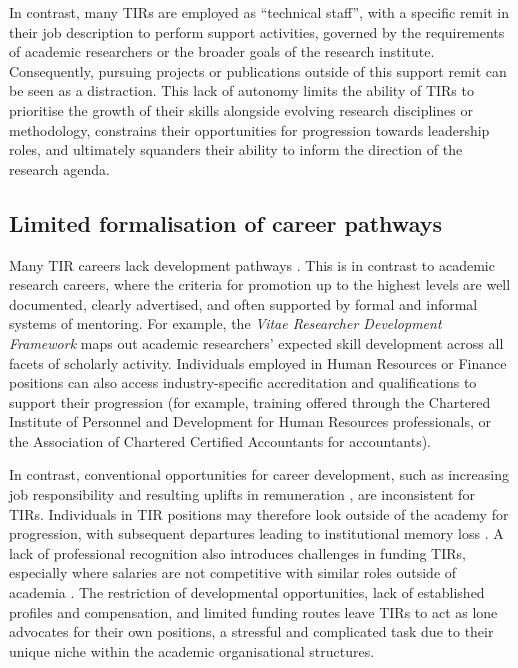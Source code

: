 \documentclass[authordate,meta,issue]{jote-new-article}
\begin{document}
In contrast, many TIRs are employed as “technical staff”, with a specific remit in their job description to perform support activities, governed by the requirements of academic researchers or the broader goals of the research institute. Consequently, pursuing projects or publications outside of this support remit can be seen as a distraction. This lack of autonomy limits the ability of TIRs to prioritise the growth of their skills alongside evolving research disciplines or methodology, constrains their opportunities for progression towards leadership roles, and ultimately squanders their ability to inform the direction of the research agenda.



\subsection{Limited formalisation of career pathways}



Many TIR careers lack development pathways \parencites{NCRIS2022}{Virágh2019}. This is in contrast to academic research careers, where the criteria for promotion up to the highest levels are well documented, clearly advertised, and often supported by formal and informal systems of mentoring. For example, the \emph{Vitae Researcher Development Framework} \parencites{Vitae2014} maps out academic researchers' expected skill development across all facets of scholarly activity. Individuals employed in Human Resources or Finance positions can also access industry-specific accreditation and qualifications to support their progression (for example, training offered through the Chartered Institute of Personnel and Development for Human Resources professionals, or the Association of Chartered Certified Accountants for accountants).







In contrast, conventional opportunities for career development, such as increasing job responsibility and resulting uplifts in remuneration \parencites{UKRI-ResearchEngland2022}{Virágh2019}, are inconsistent for TIRs. Individuals in TIR positions may therefore look outside of the academy for progression, with subsequent departures leading to institutional memory loss \parencites{Bossu2018}{McInturff2022}. A lack of professional recognition also introduces challenges in funding TIRs, especially where salaries are not competitive with similar roles outside of academia \parencites{UKRI-ResearchEngland2022}. The restriction of developmental opportunities, lack of established profiles and compensation, and limited funding routes leave TIRs to act as lone advocates for their own positions, a stressful and complicated task due to their unique niche within the academic organisational structures.
\end{document}
